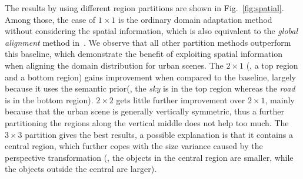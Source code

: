 \documentclass[10pt,twocolumn,letterpaper]{article}
\begin{document}
The results by using different region partitions are shown in Fig.~\ref{fig:spatial}. Among those, the case of $1 \times 1$ is the ordinary domain adaptation method without considering the spatial information, which is also equivalent to the \textit{global alignment} method in~\cite{hoffman2016fcns}. We observe that all other partition methods outperform this baseline, which demonstrate the benefit of exploiting spatial information when aligning the domain distribution for urban scenes. The $2 \times 1$ (\ie, a top region and a bottom region) gains improvement when compared to the baseline, largely because it uses the semantic prior(\eg, the \textit{sky} is in the top region whereas the \textit{road} is in the bottom region). $2 \times 2$ gets little further improvement over $2 \times 1$,  mainly because that the urban scene is generally vertically symmetric, thus a further partitioning the regions along the vertical middle does not help too much. The $3 \times 3$ partition gives the best results, a possible explanation is that it contains a central region, which further copes with the size variance caused by the perspective transformation (\eg, the objects in the central region are smaller, while the objects outside the central are larger).
\end{document}
